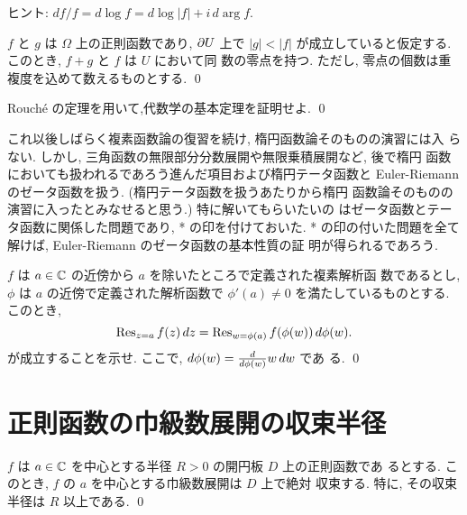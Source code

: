 \documentclass[12pt,twoside]{jarticle}
\begin{document}
\noindent ヒント: $df/f = d\log f = d\log|f| + i\,d\arg f$.

\begin{question}
  $f$ と $g$ は $\Omega$ 上の正則函数であり, $\partial U$ 上で $|g| < |f|$
  が成立していると仮定する. このとき, $f + g$ と $f$ は $U$ において同
  数の零点を持つ. ただし, 零点の個数は重複度を込めて数えるものとする.
  \qed
\end{question}

\begin{question}
  Rouch\'e の定理を用いて,代数学の基本定理を証明せよ. \qed
\end{question}


\bigskip

\begin{small}
これ以後しばらく複素函数論の復習を続け, 楕円函数論そのものの演習には入
らない. しかし, 三角函数の無限部分分数展開や無限乗積展開など, 後で楕円
函数においても扱われるであろう進んだ項目および楕円テータ函数と 
Euler-Riemann のゼータ函数を扱う. (楕円テータ函数を扱うあたりから楕円
函数論そのものの演習に入ったとみなせると思う.) 特に解いてもらいたいの
はゼータ函数とテータ函数に関係した問題であり, * の印を付けておいた.  * 
の印の付いた問題を全て解けば, Euler-Riemann のゼータ函数の基本性質の証
明が得られるであろう.
\end{small}

\bigskip


\begin{question}[留数の座標不変性]
  $f$ は $a\in{\mathbb C}$ の近傍から $a$ を除いたところで定義された複素解析函
  数であるとし, $\phi$ は $a$ の近傍で定義された解析函数で %
  $\phi'(a)\ne0$ を満たしているものとする. このとき,
  \[
    \mathop{\mathrm{Res}}\nolimits_{z=a} f(z)\,dz
    = \mathop{\mathrm{Res}}\nolimits_{w=\phi(a)} f(\phi(w))\,d\phi(w).
  \]
  が成立することを示せ. ここで, $d\phi(w) = \frac{d}{d \phi(w)}{w}\,dw$ であ
  る. \qed
\end{question}

\section{正則函数の巾級数展開の収束半径}

\begin{question}
  $f$ は $a\in{\mathbb C}$ を中心とする半径 $R>0$ の開円板 $D$ 上の正則函数であ
  るとする. このとき, $f$ の $a$ を中心とする巾級数展開は $D$ 上で絶対
  収束する. 特に, その収束半径は $R$ 以上である. \qed
\end{question}
\end{document}
